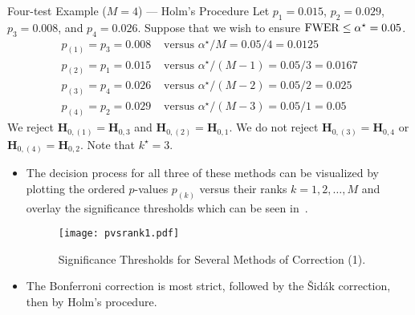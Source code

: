 \begin{Example}{Four-test Example ($ M=4 $) --- Holm's Procedure}{}
    Let $ p_1=0.015 $, $ p_2=0.029 $, $ p_3=0.008 $, and $ p_4=0.026 $. Suppose that we wish to ensure
    $ \operatorname{FWER}\le \alpha^\star=0.05 $.
    \begin{align*}
        p_{(1)}=p_3=0.008 & \text{ versus } \alpha^\star/M=0.05/4=0.0125     \\
        p_{(2)}=p_1=0.015 & \text{ versus } \alpha^\star/(M-1)=0.05/3=0.0167 \\
        p_{(3)}=p_4=0.026 & \text{ versus } \alpha^\star/(M-2)=0.05/2=0.025  \\
        p_{(4)}=p_2=0.029 & \text{ versus } \alpha^\star/(M-3)=0.05/1=0.05
    \end{align*}
    We reject $ \mathbf{H}_{0,(1)}=\mathbf{H}_{0,3} $ and $ \mathbf{H}_{0,(2)}=\mathbf{H}_{0,1} $. We do not reject
    $ \mathbf{H}_{0,(3)}=\mathbf{H}_{0,4} $ or $ \mathbf{H}_{0,(4)}=\mathbf{H}_{0,2} $. Note that $ k^\star=3 $.
\end{Example}
\begin{itemize}
    \item The decision process for all three of these methods can be visualized by plotting the ordered $p$-values
          $ p_{(k)} $ versus their ranks $ k=1,2,\ldots,M $ and overlay the significance thresholds which can
          be seen in~.
          \begin{figure}[!htbp]
              \centering
              \texttt{[image: pvsrank1.pdf]}
              \caption{Significance Thresholds for Several Methods of Correction (1).}\label{fig:pvsrank1}
          \end{figure}
    \item The Bonferroni correction is most strict, followed by the Šidák correction, then by Holm's procedure.
\end{itemize}
